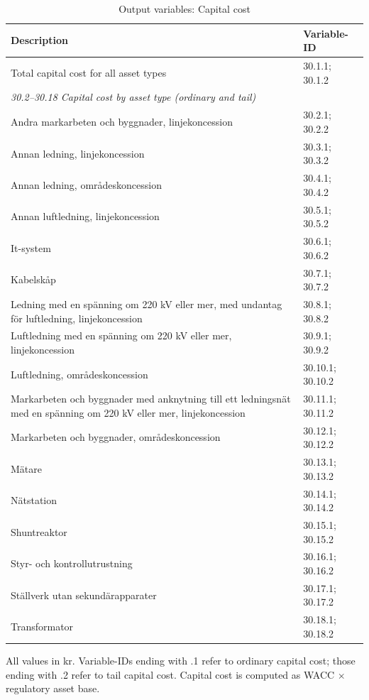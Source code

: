 \begin{table}[H]
\centering
\footnotesize
\begin{threeparttable}
\caption{Output variables: Capital cost}
\label{tab:capital-cost-variables}
\begin{tabular}{@{}p{9cm}l@{}}
\toprule
\textbf{Description} & \textbf{Variable-ID} \\
\midrule
Total capital cost for all asset types & 30.1.1; 30.1.2 \\
\midrule
\multicolumn{2}{l}{\textit{30.2--30.18 Capital cost by asset type (ordinary and tail)}} \\
Andra markarbeten och byggnader, linjekoncession & 30.2.1; 30.2.2 \\
Annan ledning, linjekoncession & 30.3.1; 30.3.2 \\
Annan ledning, områdeskoncession & 30.4.1; 30.4.2 \\
Annan luftledning, linjekoncession & 30.5.1; 30.5.2 \\
It-system & 30.6.1; 30.6.2 \\
Kabelskåp & 30.7.1; 30.7.2 \\
Ledning med en spänning om 220 kV eller mer, med undantag för luftledning, linjekoncession & 30.8.1; 30.8.2 \\
Luftledning med en spänning om 220 kV eller mer, linjekoncession & 30.9.1; 30.9.2 \\
Luftledning, områdeskoncession & 30.10.1; 30.10.2 \\
Markarbeten och byggnader med anknytning till ett ledningsnät med en spänning om 220 kV eller mer, linjekoncession & 30.11.1; 30.11.2 \\
Markarbeten och byggnader, områdeskoncession & 30.12.1; 30.12.2 \\
Mätare & 30.13.1; 30.13.2 \\
Nätstation & 30.14.1; 30.14.2 \\
Shuntreaktor & 30.15.1; 30.15.2 \\
Styr- och kontrollutrustning & 30.16.1; 30.16.2 \\
Ställverk utan sekundärapparater & 30.17.1; 30.17.2 \\
Transformator & 30.18.1; 30.18.2 \\
\bottomrule
\end{tabular}
\begin{tablenotes}
\item All values in kr. Variable-IDs ending with .1 refer to ordinary capital cost; those ending with .2 refer to tail capital cost. Capital cost is computed as WACC $\times$ regulatory asset base.
\end{tablenotes}
\end{threeparttable}
\end{table}



